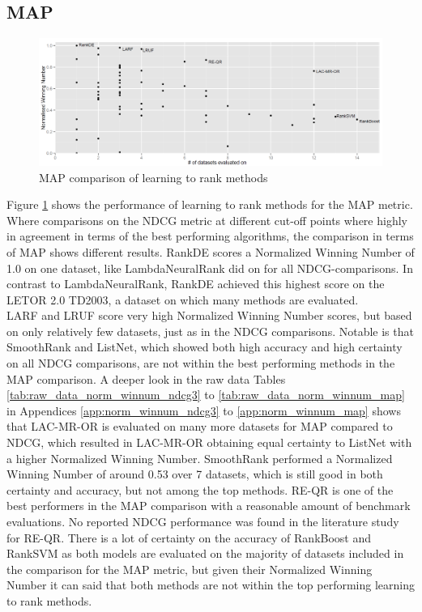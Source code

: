 \documentclass{sig-alternate-2013}
\begin{document}
\subsection{MAP}
\begin{figure}
\includegraphics[scale=0.371]{gfx/map_winnum}
\caption{MAP comparison of learning to rank methods}
\label{fig:normalised_winning_number_map}
\end{figure}
Figure \ref{fig:normalised_winning_number_map} shows the performance of learning to rank methods for the MAP metric. Where comparisons on the NDCG metric at different cut-off points where highly in agreement in terms of the best performing algorithms, the comparison in terms of MAP shows different results. RankDE scores a Normalized Winning Number of 1.0 on one dataset, like LambdaNeuralRank did on for all NDCG-comparisons. In contrast to LambdaNeuralRank, RankDE achieved this highest score on the LETOR 2.0 TD2003, a dataset on which many methods are evaluated.\\

LARF and LRUF score very high Normalized Winning Number scores, but based on only relatively few datasets, just as in the NDCG comparisons. Notable is that SmoothRank and ListNet, which showed both high accuracy and high certainty on all NDCG comparisons, are not within the best performing methods in the MAP comparison. A deeper look in the raw data Tables \ref{tab:raw_data_norm_winnum_ndcg3} to \ref{tab:raw_data_norm_winnum_map} in Appendices \ref{app:norm_winnum_ndcg3} to \ref{app:norm_winnum_map} shows that LAC-MR-OR is evaluated on many more datasets for MAP compared to NDCG, which resulted in LAC-MR-OR obtaining equal certainty to ListNet with a higher Normalized Winning Number. SmoothRank performed a Normalized Winning Number of around 0.53 over 7 datasets, which is still good in both certainty and accuracy, but not among the top methods. RE-QR is one of the best performers in the MAP comparison with a reasonable amount of benchmark evaluations. No reported NDCG performance was found in the literature study for RE-QR. There is a lot of certainty on the accuracy of RankBoost and RankSVM as both models are evaluated on the majority of datasets included in the comparison for the MAP metric, but given their Normalized Winning Number it can said that both methods are not within the top performing learning to rank methods.
\end{document}
